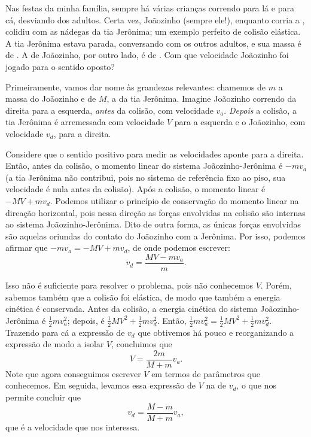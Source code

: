\begin{question}
	Nas festas da minha família, sempre há várias crianças correndo para lá e para cá, desviando dos adultos.
	Certa vez, Joãozinho (sempre ele!), enquanto corria a , colidiu com as nádegas da tia Jerônima; um exemplo perfeito de colisão elástica.
	A tia Jerônima estava parada, conversando com os outros adultos, e sua massa é de .
	A de Joãozinho, por outro lado, é de .
	Com que velocidade Joãozinho foi jogado para o sentido oposto?

	\begin{answer}
	\end{answer}

	\begin{solution}
		Primeiramente, vamos dar nome às grandezas relevantes: chamemos de $m$ a massa do Joãozinho e de $M$, a da tia Jerônima.
		Imagine Joãozinho correndo da direita para a esquerda, \emph{antes} da colisão, com velocidade $v_a$.
		\emph{Depois} a colisão, a tia Jerônima é arremessada com velocidade $V$ para a esquerda e o Joãozinho, com velocidade $v_d$, para a direita.

		Considere que o sentido positivo para medir as velocidades aponte para a direita.
		Então, antes da colisão, o momento linear do sistema Joãozinho-Jerônima é $-mv_a$ (a tia Jerônima não contribui, pois no sistema de referência fixo ao piso, sua velocidade é nula antes da colisão).
		Após a colisão, o momento linear é $-MV+mv_d$.
		Podemos utilizar o princípio de conservação do momento linear na direação horizontal, pois nessa direção as forças envolvidas na colisão são internas ao sistema Joãozinho-Jerônima.
		Dito de outra forma, as únicas forças envolvidas são aquelas oriundas do contato do Joãozinho com a Jerônima.
		Por isso, podemos afirmar que $-mv_a = -MV + mv_d$, de onde podemos escrever:
		\begin{equation*}
			v_d = \frac{MV-mv_a}{m}.
		\end{equation*}

		Isso não é suficiente para resolver o problema, pois não conhecemos $V$.
		Porém, sabemos também que a colisão foi elástica, de modo que também a energia cinética é conservada.
		Antes da colisão, a energia cinética do sistema Joãozinho-Jerônima é $\frac{1}{2}mv_a^2$; depois, é $\frac{1}{2}MV^2 + \frac{1}{2}mv_d^2$.
		Então, $\frac{1}{2}mv_a^2 = \frac{1}{2}MV^2 + \frac{1}{2}mv_d^2$.
		Trazendo para cá a expressão de $v_d$ que obtivemos há pouco e reorganizando a expressão de modo a isolar $V$, concluimos que
		\begin{equation*}
			V = \frac{2m}{M+m}v_a.
		\end{equation*}
		Note que agora conseguimos escrever $V$ em termos de parâmetros que conhecemos.
		Em seguida, levamos essa expressão de $V$ na de $v_d$, o que nos permite concluir que
		\begin{equation*}
			v_d = \frac{M-m}{M+m}v_a,
		\end{equation*}
		que é a velocidade que nos interessa.


\end{solution}
\end{question}
